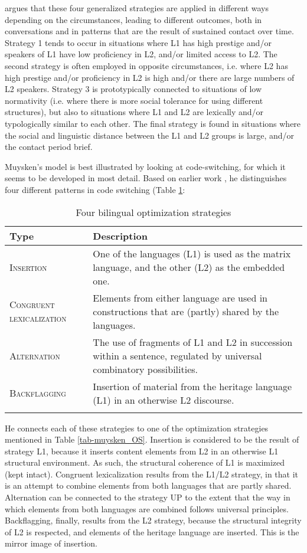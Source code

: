\cite{muysken2013language} argues that these four generalized strategies are applied in different ways depending on the circumstances, leading to different outcomes, both in conversations and in patterns that are the result of sustained contact over time. Strategy 1 tends to occur in situations where L1 has high prestige and/or speakers of L1 have low proficiency in L2, and/or limited access to L2. The second strategy is often employed in opposite circumstances, i.e. where L2 has high prestige and/or proficiency in L2 is high and/or there are large numbers of L2 speakers. Strategy 3 is prototypically connected to situations of low normativity (i.e. where there is more social tolerance for using different structures), but also to situations where L1 and L2 are lexically and/or typologically similar to each other. The final strategy is found in situations where the social and linguistic distance between the L1 and L2 groups is large, and/or the contact period brief.

Muysken's model is best illustrated by looking at code-switching, for which it seems to be developed in most detail. Based on earlier work \parencite{muysken2000}, he distinguishes four different patterns in code switching (Table \ref{tab-muysken_CS}:

\begin{table}
\caption{Four bilingual optimization strategies}  
\label{tab-muysken_CS}
 \begin{tabular}{p{2.6cm} p{9cm}} 
  \lsptoprule
 Type & Description \\ 
  \midrule
 \textsc{Insertion} & One of the languages (L1) is used as the matrix language, and the other (L2) as the embedded one.\\
    \textsc{Congruent lexicalization} & Elements from either language are used in constructions that are (partly) shared by the languages.\\
    \textsc{Alternation} & The use of fragments of L1 and L2 in succession within a sentence, regulated by universal combinatory possibilities.\\
    \textsc{Backflagging} & Insertion of material from the heritage language (L1) in an otherwise L2 discourse.\\
\lspbottomrule
 \end{tabular}
\end{table}

He connects each of these strategies to one of the optimization strategies mentioned in Table \ref{tab-muysken_OS}. Insertion is considered to be the result of strategy L1, because it inserts content elements from L2 in an otherwise L1 structural environment. As such, the structural coherence of L1 is maximized (kept intact). Congruent lexicalization results from the L1/L2 strategy, in that it is an attempt to combine elements from both languages that are partly shared. Alternation can be connected to the strategy UP to the extent that the way in which elements from both languages are combined follows universal principles. Backflagging, finally, results from the L2 strategy, because the structural integrity of L2 is respected, and elements of the heritage language are inserted. This is the mirror image of insertion.

